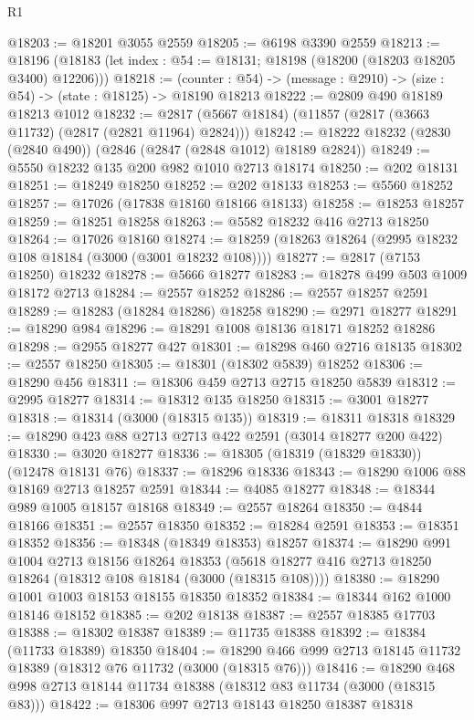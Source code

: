 \begin{lexlean}{R1}
\begin{coremodule}
@18203 := @18201 @3055 @2559
@18205 := @6198 @3390 @2559
@18213 := @18196 (@18183 (let index : @54 := @18131; @18198 (@18200 (@18203 @18205 @3400) @12206)))
@18218 := (counter : @54) -> (message : @2910) -> (size : @54) -> (state : @18125) -> @18190 @18213
@18222 := @2809 @490 @18189 @18213 @1012
@18232 := @2817 (@5667 @18184) (@11857 (@2817 (@3663 @11732) (@2817 (@2821 @11964) @2824)))
@18242 := @18222 @18232 (@2830 (@2840 @490)) (@2846 (@2847 (@2848 @1012) @18189 @2824))
@18249 := @5550 @18232 @135 @200 @982 @1010 @2713 @18174
@18250 := @202 @18131
@18251 := @18249 @18250
@18252 := @202 @18133
@18253 := @5560 @18252
@18257 := @17026 (@17838 @18160 @18166 @18133)
@18258 := @18253 @18257
@18259 := @18251 @18258
@18263 := @5582 @18232 @416 @2713 @18250
@18264 := @17026 @18160
@18274 := @18259 (@18263 @18264 (@2995 @18232 @108 @18184 (@3000 (@3001 @18232 @108))))
@18277 := @2817 (@7153 @18250) @18232
@18278 := @5666 @18277
@18283 := @18278 @499 @503 @1009 @18172 @2713
@18284 := @2557 @18252
@18286 := @2557 @18257 @2591
@18289 := @18283 (@18284 @18286) @18258
@18290 := @2971 @18277
@18291 := @18290 @984
@18296 := @18291 @1008 @18136 @18171 @18252 @18286
@18298 := @2955 @18277 @427
@18301 := @18298 @460 @2716 @18135
@18302 := @2557 @18250
@18305 := @18301 (@18302 @5839) @18252
@18306 := @18290 @456
@18311 := @18306 @459 @2713 @2715 @18250 @5839
@18312 := @2995 @18277
@18314 := @18312 @135 @18250
@18315 := @3001 @18277
@18318 := @18314 (@3000 (@18315 @135))
@18319 := @18311 @18318
@18329 := @18290 @423 @88 @2713 @2713 @422 @2591 (@3014 @18277 @200 @422)
@18330 := @3020 @18277
@18336 := @18305 (@18319 (@18329 @18330)) (@12478 @18131 @76)
@18337 := @18296 @18336
@18343 := @18290 @1006 @88 @18169 @2713 @18257 @2591
@18344 := @4085 @18277
@18348 := @18344 @989 @1005 @18157 @18168
@18349 := @2557 @18264
@18350 := @4844 @18166
@18351 := @2557 @18350
@18352 := @18284 @2591
@18353 := @18351 @18352
@18356 := @18348 (@18349 @18353) @18257
@18374 := @18290
    @991
    @1004
    @2713
    @18156
    @18264
    @18353
    (@5618 @18277 @416 @2713 @18250 @18264 (@18312 @108 @18184 (@3000 (@18315 @108))))
@18380 := @18290 @1001 @1003 @18153 @18155 @18350 @18352
@18384 := @18344 @162 @1000 @18146 @18152
@18385 := @202 @18138
@18387 := @2557 @18385 @17703
@18388 := @18302 @18387
@18389 := @11735 @18388
@18392 := @18384 (@11733 @18389) @18350
@18404 := @18290 @466 @999 @2713 @18145 @11732 @18389 (@18312 @76 @11732 (@3000 (@18315 @76)))
@18416 := @18290 @468 @998 @2713 @18144 @11734 @18388 (@18312 @83 @11734 (@3000 (@18315 @83)))
@18422 := @18306 @997 @2713 @18143 @18250 @18387 @18318

\end{coremodule}
\end{lexlean}
